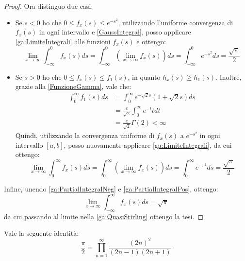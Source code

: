 \begin{proof}
	Ora distinguo due casi:
	\begin{itemize}
		\item	Se $s<0$ ho che $0\le f_x(s) \le e^{-s^2}$, utilizzando l'uniforme convergenza di $f_x(s)$ in ogni
				intervallo e \cref{GaussIntegral}, posso applicare \cref{ga:LimiteIntegrali} alle funzioni $f_x(s)$ 
				e ottengo:
				\begin{equation}\label{ga:PartialIntegralNeg}
					\lim_{x\to\infty} \int_{-\infty}^0{f_x(s)ds}=\int_{-\infty}^0{\left(\lim_{x\to\infty}f_x(s)\right)ds}
					=\int_{-\infty}^0{e^{-s^2}ds}=\frac{\sqrt{\pi}}{2}
				\end{equation}
		\item	Se $s>0$ ho che $0\le f_x(s) \le f_1(s)$, in quanto $h_x(s)\ge h_1(s)$. Inoltre, grazie
				alla \cref{FunzioneGamma}, vale che:
				\begin{equation*}
				\begin{split}
					\int_0^{\infty}{f_1(s)ds}	&=\int_0^\infty{e^{-\sqrt{2}s}\left(1+\sqrt{2}s \right)ds}\\
												&=\frac{e}{\sqrt{2}}\int_0^\infty{e^{-t}t dt}\\
												&=\frac{e}{\sqrt{2}}\Gamma(2)<\infty
				\end{split}
				\end{equation*}
				Quindi, utilizzando la convergenza uniforme di $f_x(s)$ a $e^{-s^2}$ in ogni intervallo
				$[a,b]$, posso nuovamente applicare \cref{ga:LimiteIntegrali}, da cui ottengo:
				\begin{equation}\label{ga:PartialIntegralPos}
					\lim_{x\to\infty} \int_0^\infty{f_x(s)ds}=\int_0^\infty{\left(\lim_{x\to\infty}f_x(s)\right)ds}
					=\int_0^\infty{e^{-s^2}ds}=\frac{\sqrt{\pi}}{2}
				\end{equation}
	\end{itemize}
	
	Infine, unendo \cref{ga:PartialIntegralNeg} e \cref{ga:PartialIntegralPos}, ottengo:
	\begin{equation*}
		\lim_{x\to\infty}\int_{-\infty}^\infty{ f_x(s) ds}=\sqrt{\pi}
	\end{equation*}
	da cui passando al limite nella \cref{ga:QuasiStirling} ottengo la tesi.
\end{proof}

\begin{lemma}\label{ga:WallisProduct}
	Vale la seguente identità:
	\begin{equation*}
		\frac{\pi}{2}=\prod_{n=1}^\infty\frac{(2n)^2}{(2n-1)(2n+1)}
	\end{equation*}
\end{lemma}


